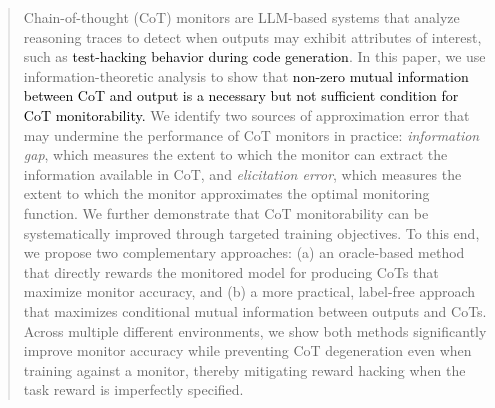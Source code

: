 \documentclass{article}
\theoremstyle{plain}
\begin{document}
\printAffiliationsAndNotice{\icmlEqualContribution}

\newcommand{\changed}[1]{\textcolor{black}{#1}}

\begin{abstract}
Chain-of-thought (CoT) monitors are LLM-based systems that analyze reasoning traces to detect when outputs may exhibit attributes of interest, such as \changed{test-hacking behavior during code generation}.
In this paper, we use information-theoretic analysis to show that \changed{non-zero mutual information between CoT and output is a necessary but not sufficient condition for CoT monitorability.}
We identify two sources of approximation error that may undermine the performance of CoT monitors in practice: \textit{information gap}, which measures the extent to which the monitor can extract the information available in CoT, and \textit{elicitation error}, which measures the extent to which the monitor approximates the optimal monitoring function.
We further demonstrate that CoT monitorability can be systematically improved through targeted training objectives.
To this end, we propose two complementary approaches: (a) an oracle-based method that directly rewards the monitored model for producing CoTs that maximize monitor accuracy, and (b) a more practical, label-free approach that maximizes conditional mutual information between outputs and CoTs.
Across multiple different environments, we show both methods significantly improve monitor accuracy while preventing CoT degeneration even when training against a monitor, thereby mitigating reward hacking when the task reward is imperfectly specified.

\end{abstract}
\end{document}
